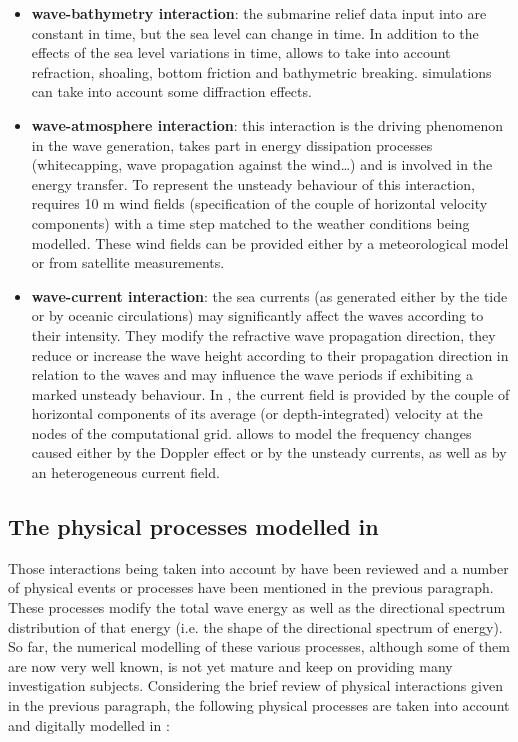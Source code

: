 \begin{itemize}

\item {\bf wave-bathymetry interaction}: the submarine relief data input into \tomawac are constant in time, but the sea level can change in time. In addition to the effects of the sea level variations in time, \tomawac allows to take into account refraction, shoaling, bottom friction and bathymetric breaking. \tomawac simulations can take into account some diffraction effects.
\item {\bf wave-atmosphere interaction}: this interaction is the driving phenomenon in the wave generation, takes part in energy dissipation processes (whitecapping, wave propagation against the wind…) and is involved in the energy transfer. To represent the unsteady behaviour of this interaction, \tomawac requires 10 m wind fields (specification of the couple of horizontal velocity components) with a time step matched to the weather conditions being modelled. These wind fields can be provided either by a meteorological model or from satellite measurements.
\item {\bf wave-current interaction}: the sea currents (as generated either by the tide or by oceanic circulations) may significantly affect the waves according to their intensity. They modify the refractive wave propagation direction, they reduce or increase the wave height according to their propagation direction in relation to the waves and may influence the wave periods if exhibiting a marked unsteady behaviour. In \tomawac, the current field is provided by the couple of horizontal components of its average (or depth-integrated) velocity at the nodes of the computational grid. \tomawac allows to model the frequency changes caused either by the Doppler effect or by the unsteady currents, as well as by an heterogeneous current field.
\end{itemize}
\subsection{ The physical processes modelled in \tomawac}
Those interactions being taken into account by \tomawac have been reviewed and a number of physical events or processes have been mentioned in the previous paragraph. These processes modify the total wave energy as well as the directional spectrum distribution of that energy (i.e. the shape of the directional spectrum of energy). So far, the numerical modelling of these various processes, although some of them are now very well known, is not yet mature and keep on providing many investigation subjects. Considering the brief review of physical interactions given in the previous paragraph, the following physical processes are taken into account and digitally modelled in \tomawac:

